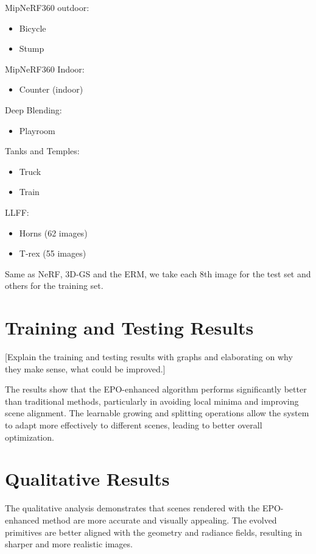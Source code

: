 \documentclass[11pt]{report}
\begin{document}
MipNeRF360 outdoor:
\begin{itemize}
    \item Bicycle 
    \item Stump
\end{itemize}

MipNeRF360 Indoor:
\begin{itemize}
    \item Counter (indoor)
\end{itemize}

Deep Blending:
\begin{itemize}
    \item Playroom
\end{itemize}

Tanks and Temples:
\begin{itemize}
    \item Truck
    \item Train
\end{itemize}

LLFF:
\begin{itemize}
    \item Horns (62 images)
    \item T-rex (55 images)
\end{itemize}

Same as NeRF, 3D-GS and the ERM, we take each 8th image for the test set and others for the training set.

\section{Training and Testing Results}
[Explain the training and testing results with graphs and elaborating on why they make sense, what could be improved.]

The results show that the EPO-enhanced algorithm performs significantly better than traditional methods, particularly in avoiding local minima and improving scene alignment. The learnable growing and splitting operations allow the system to adapt more effectively to different scenes, leading to better overall optimization.


\section{Qualitative Results}

The qualitative analysis demonstrates that scenes rendered with the EPO-enhanced method are more accurate and visually appealing. The evolved primitives are better aligned with the geometry and radiance fields, resulting in sharper and more realistic images.
\end{document}
